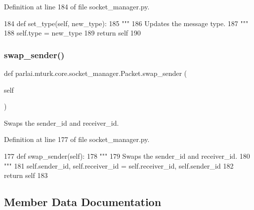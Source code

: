 Definition at line 184 of file socket\+\_\+manager.\+py.


\begin{DoxyCode}
184     \textcolor{keyword}{def }set\_type(self, new\_type):
185         \textcolor{stringliteral}{"""}
186 \textcolor{stringliteral}{        Updates the message type.}
187 \textcolor{stringliteral}{        """}
188         self.type = new\_type
189         \textcolor{keywordflow}{return} self
190 
\end{DoxyCode}
\mbox{\label{classparlai_1_1mturk_1_1core_1_1socket__manager_1_1Packet_a369524e6a2a2628fe23d5277fb90a600}} 
\subsubsection{\texorpdfstring{swap\+\_\+sender()}{swap\_sender()}}
{\footnotesize\ttfamily def parlai.\+mturk.\+core.\+socket\+\_\+manager.\+Packet.\+swap\+\_\+sender (\begin{DoxyParamCaption}\item[{}]{self }\end{DoxyParamCaption})}

\begin{DoxyVerb}Swaps the sender_id and receiver_id.
\end{DoxyVerb}
 

Definition at line 177 of file socket\+\_\+manager.\+py.


\begin{DoxyCode}
177     \textcolor{keyword}{def }swap\_sender(self):
178         \textcolor{stringliteral}{"""}
179 \textcolor{stringliteral}{        Swaps the sender\_id and receiver\_id.}
180 \textcolor{stringliteral}{        """}
181         self.sender\_id, self.receiver\_id = self.receiver\_id, self.sender\_id
182         \textcolor{keywordflow}{return} self
183 
\end{DoxyCode}


\subsection{Member Data Documentation}
\mbox{\label{classparlai_1_1mturk_1_1core_1_1socket__manager_1_1Packet_a676008ae4aaa55d7551a94d246b1b931}} 
